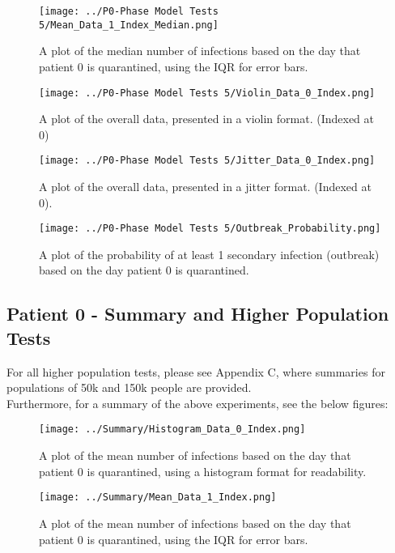 \documentclass{article}
\numberwithin{equation}{section} %
\begin{document}
\begin{figure}[H]
  \centering
  \texttt{[image: ../P0-Phase Model Tests 5/Mean\_Data\_1\_Index\_Median.png]}
  \caption{A plot of the median number of infections based on the day that patient 0 is quarantined, using the IQR for error bars.}
\end{figure}

\begin{figure}[H]
  \centering
  \texttt{[image: ../P0-Phase Model Tests 5/Violin\_Data\_0\_Index.png]}
  \caption{A plot of the overall data, presented in a violin format. (Indexed at 0)}
\end{figure}

\begin{figure}[H]
  \centering
  \texttt{[image: ../P0-Phase Model Tests 5/Jitter\_Data\_0\_Index.png]}
  \caption{A plot of the overall data, presented in a jitter format. (Indexed at 0).}
\end{figure}

\begin{figure}[H]
  \centering
  \texttt{[image: ../P0-Phase Model Tests 5/Outbreak\_Probability.png]}
  \caption{A plot of the probability of at least 1 secondary infection (outbreak) based on the day patient 0 is quarantined.}
\end{figure}

\subsection{Patient 0 - Summary and Higher Population Tests}
For all higher population tests, please see Appendix C, where summaries for populations of 50k and 150k people are provided. \\

Furthermore, for a summary of the above experiments, see the below figures:

\begin{figure}[H]
  \centering
  \texttt{[image: ../Summary/Histogram\_Data\_0\_Index.png]}
  \caption{A plot of the mean number of infections based on the day that patient 0 is quarantined, using a histogram format for readability.}
\end{figure}

\begin{figure}[H]
  \centering
  \texttt{[image: ../Summary/Mean\_Data\_1\_Index.png]}
  \caption{A plot of the mean number of infections based on the day that patient 0 is quarantined, using the IQR for error bars.}
\end{figure}
\end{document}
